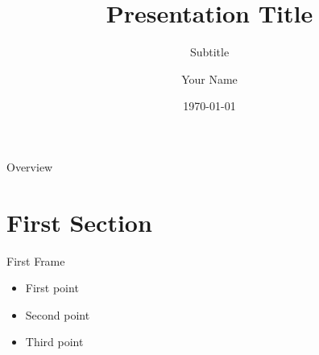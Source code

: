 \documentclass[10pt]{beamer}
\title{Presentation Title}
\subtitle{Subtitle}
\date{\today}
\author{Your Name}
\institute{Your Institution}
\begin{document}
\maketitle

\begin{frame}{Overview}
  \tableofcontents
\end{frame}

\section{First Section}

\begin{frame}{First Frame}
  \begin{itemize}
    \item First point
    \item Second point
    \item Third point
  \end{itemize}
\end{frame}
\end{document}
